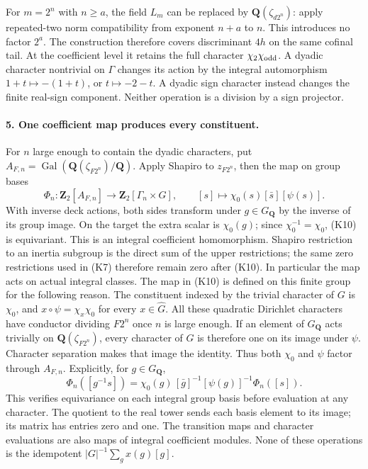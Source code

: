 For $m=2^n$ with $n\geq a$, the field $L_m$ can be replaced by
$\mathbf Q(\zeta_{d2^n})$: apply repeated-two norm compatibility
from exponent $n+a$ to $n$. This introduces no factor $2^a$.
The construction therefore covers discriminant $4h$ on the same
cofinal tail. At the coefficient level it retains the full character
$\chi_2\chi_{\rm odd}$. A dyadic character nontrivial on $\Gamma$
changes its action by the integral automorphism
$1+t\mapsto-(1+t)$, or $t\mapsto-2-t$. A dyadic sign character
instead changes the finite real-sign component. Neither operation
is a division by a sign projector.

\paragraph{5. One coefficient map produces every constituent.}
For $n$ large enough to contain the dyadic characters, put
$A_{F,n}=\operatorname{Gal}(\mathbf Q(\zeta_{F2^n})/\mathbf Q)$.
Apply Shapiro to $z_{F2^n}$, then the map on group bases
\[
 \Phi_n:\mathbf Z_2[A_{F,n}]\longrightarrow
                  \mathbf Z_2[\Gamma_n\times G],\qquad
 [s]\longmapsto\chi_0(s)[\bar s][\psi(s)].                 \tag{K10}
\]
With inverse deck actions, both sides transform under $g\in G_{\mathbf Q}$
by the inverse of its group image. On the target the extra scalar
is $\chi_0(g)$; since $\chi_0^{-1}=\chi_0$, (K10) is equivariant.
This is an integral coefficient homomorphism. Shapiro restriction
to an inertia subgroup is the direct sum of the upper restrictions;
the same zero restrictions used in (K7) therefore remain zero after
(K10). In particular the map acts on actual integral classes.
The map in (K10) is defined on this finite group for the following
reason. The constituent indexed by the trivial character of $G$ is
$\chi_0$, and
$x\circ\psi=\chi_x\chi_0$ for every $x\in\widehat G$.
All these quadratic Dirichlet characters have conductor dividing
$F2^n$ once $n$ is large enough. If an element of $G_{\mathbf Q}$
acts trivially on $\mathbf Q(\zeta_{F2^n})$, every character of $G$
is therefore one on its image under $\psi$. Character separation
makes that image the identity. Thus both $\chi_0$ and $\psi$
factor through $A_{F,n}$. Explicitly, for $g\in G_{\mathbf Q}$,
\[
 \Phi_n([g^{-1}s])
 =\chi_0(g)\,[\bar g]^{-1}[\psi(g)]^{-1}\Phi_n([s]).
\]
This verifies equivariance on each integral group basis before
evaluation at any character. The quotient to the real tower sends
each basis element to its image; its matrix has entries zero and
one. The transition maps and character evaluations are also maps
of integral coefficient modules. None of these operations is the
idempotent $|G|^{-1}\sum_g x(g)[g]$.


